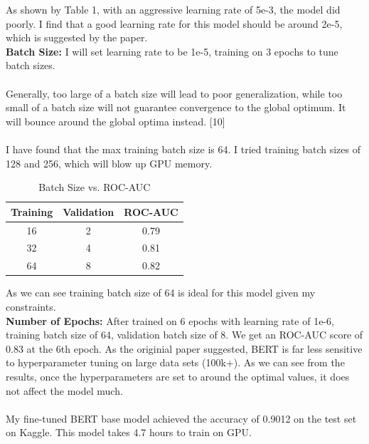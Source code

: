 \documentclass[11pt,a4paper]{article}
\begin{document}
\noindent As shown by Table 1, with an aggressive learning rate of 5e-3, the model did poorly. I find that a good learning rate for this model should be around 2e-5, which is suggested by the paper.\\

\noindent \textbf {Batch Size:} I will set learning rate to be 1e-5, training on 3 epochs to tune batch sizes.\\
\\
Generally, too large of a batch size will lead to poor generalization, while too small of a batch size will not guarantee convergence to the global optimum. It will bounce around the global optima instead. [10]\\
\\
I have found that the max training batch size is 64. I tried training batch sizes of 128 and 256, which will blow up GPU memory.\\

\begin{table}[!htbp]
	\centering
	\begin{tabular}{|c|c|c|}
		\hline
		{Training} & {Validation} & {ROC-AUC} \\ \hline
		16                           & 2                              & 0.79             \\ \hline
		32                           & 4                              & 0.81             \\ \hline
		64                           & 8                              & 0.82             \\ \hline
	\end{tabular}
	\caption{\label{table:my-label} Batch Size vs. ROC-AUC}
\end{table}

\noindent As we can see training batch size of 64 is ideal for this model given my constraints.\\

\noindent \textbf {Number of Epochs: }  After trained on 6 epochs with learning rate of 1e-6, training batch size of 64, validation batch size of 8. We get an ROC-AUC score of 0.83 at the 6th epoch. As the originial paper suggested, BERT is far less sensitive to hyperparameter tuning on large data sets (100k+)\cite{BERT}. As we can see from the results, once the hyperparameters are set to around the optimal values, it does not affect the model much.\\
\\
\noindent My fine-tuned BERT base model achieved the accuracy of 0.9012 on the test set on Kaggle. This model takes 4.7 hours to train on GPU.\\
\end{document}

